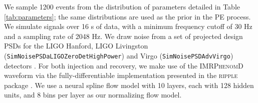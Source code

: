 \documentclass[twocolumn]{aastex631}
\begin{document}
We sample 1200 events from the distribution of parameters detailed in Table
\ref{tab:parameters}; the same distributions are used as the prior in the PE
process.  We simulate signals over 16 s of data, with a minimum frequency
cutoff of 30 Hz and a sampling rate of 2048 Hz. We draw noise from a set of
projected design PSDs for the LIGO Hanford, LIGO Livingston
(\texttt{SimNoisePSDaLIGOZeroDetHighPower}) and Virgo
(\texttt{SimNoisePSDAdvVirgo}) detectors
\cite{lalsuite,Shoemaker:T0900288,2012arXiv1202.4031M}. For both injection and
recovery, we make use of the \textsc{IMRPhenomD} waveform \cite{Khan:2015jqa}
via the fully-differentiable implementation presented in the \textsc{ripple}
package \cite{ripplepaper}. We use a neural spline flow model \cite{2019arXiv190604032D}
with 10 layers, each with 128 hidden units, and 8 bins per layer as our
normalizing flow model.
\end{document}
